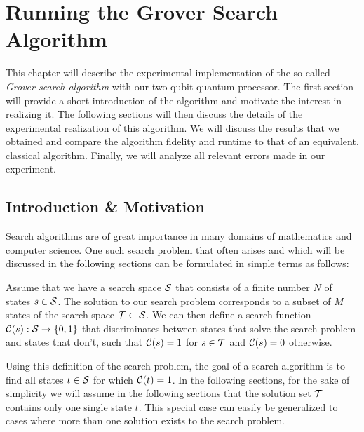 
\chapter{Running the Grover Search Algorithm}

This chapter will describe the experimental implementation of the so-called {\it Grover search algorithm} with our two-qubit quantum processor. The first section will provide a short introduction of the algorithm and motivate the interest in realizing it. The following sections will then discuss the details of the experimental realization of this algorithm. We will discuss the results that we obtained and compare the algorithm fidelity and runtime to that of an equivalent, classical algorithm. Finally, we will analyze all relevant errors made in our experiment.

\section{Introduction \& Motivation}

Search algorithms are of great importance in many domains of mathematics and computer science. One such search problem that often arises and which will be discussed in the following sections can be formulated in simple terms as follows:

\begin{theorem}
Assume that we have a search space $\begin{mathcal}S\end{mathcal}$ that consists of a finite number $N$ of states $s \in \begin{mathcal}S\end{mathcal}$. The solution to our search problem corresponds to a subset of $M$ states of the search space $\begin{mathcal}T\end{mathcal} \subset \begin{mathcal}S\end{mathcal}$. We can then define a search function $\Or(s):\begin{mathcal}S\end{mathcal}\to \{0,1\}$ that discriminates between states that solve the search problem and states that don't, such that $\Or(s) = 1$ for $s \in \begin{mathcal}T\end{mathcal}$ and $\Or(s) = 0$ otherwise.
\end{theorem}

Using this definition of the search problem, the goal of a search algorithm is to find all states $t\in\begin{mathcal}S\end{mathcal}$ for which $\Or(t) = 1$. In the following sections, for the sake of simplicity we will assume in the following sections that the solution set $\begin{mathcal}T\end{mathcal}$ contains only one single state $t$. This special case can easily be generalized to cases where more than one solution exists to the search problem.

